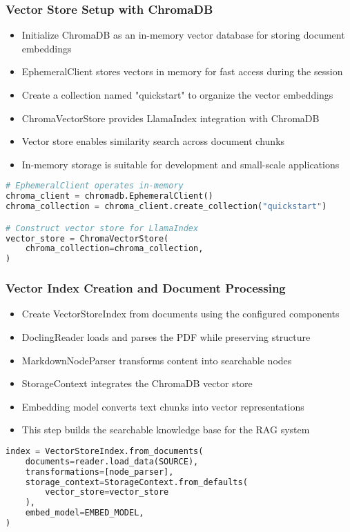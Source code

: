 \begin{frame}[fragile]\frametitle{Vector Store Setup with ChromaDB}
      \begin{itemize}
          \item Initialize ChromaDB as an in-memory vector database for storing document embeddings
          \item EphemeralClient stores vectors in memory for fast access during the session
          \item Create a collection named "quickstart" to organize the vector embeddings
          \item ChromaVectorStore provides LlamaIndex integration with ChromaDB
          \item Vector store enables similarity search across document chunks
          \item In-memory storage is suitable for development and small-scale applications
      \end{itemize}
      
\begin{lstlisting}[language=Python]
# EphemeralClient operates in-memory
chroma_client = chromadb.EphemeralClient()
chroma_collection = chroma_client.create_collection("quickstart")

# Construct vector store for LlamaIndex
vector_store = ChromaVectorStore(
    chroma_collection=chroma_collection,
)
\end{lstlisting}
\end{frame}

\begin{frame}[fragile]\frametitle{Vector Index Creation and Document Processing}
      \begin{itemize}
          \item Create VectorStoreIndex from documents using the configured components
          \item DoclingReader loads and parses the PDF while preserving structure
          \item MarkdownNodeParser transforms content into searchable nodes
          \item StorageContext integrates the ChromaDB vector store
          \item Embedding model converts text chunks into vector representations
          \item This step builds the searchable knowledge base for the RAG system
      \end{itemize}
      
\begin{lstlisting}[language=Python]
index = VectorStoreIndex.from_documents(
    documents=reader.load_data(SOURCE),
    transformations=[node_parser],
    storage_context=StorageContext.from_defaults(
        vector_store=vector_store
    ),
    embed_model=EMBED_MODEL,
)
\end{lstlisting}
\end{frame}

